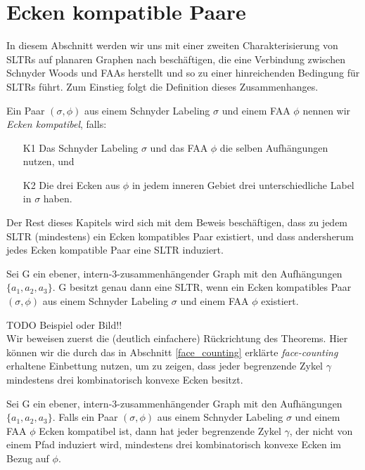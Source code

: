 \section{Ecken kompatible Paare}

In diesem Abschnitt werden wir uns mit einer zweiten Charakterisierung von SLTRs auf planaren Graphen nach \cite{af15} beschäftigen, die eine Verbindung zwischen Schnyder Woods und FAAs herstellt und so zu einer hinreichenden Bedingung für SLTRs führt. Zum Einstieg folgt die Definition dieses Zusammenhanges.

\begin{definition}\label{def_ccc}
Ein Paar $(\sigma,\phi)$ aus einem Schnyder Labeling $\sigma$ und einem FAA $\phi$ nennen wir \textit{Ecken kompatibel}, falls:
\begin{itemize}
\item [K1] Das Schnyder Labeling $\sigma$ und das FAA $\phi$ die selben Aufhängungen nutzen, und
\item [K2] Die drei Ecken aus $\phi$ in jedem inneren Gebiet drei unterschiedliche Label in $\sigma$ haben.
\end{itemize}
\end{definition}

Der Rest dieses Kapitels wird sich mit dem Beweis beschäftigen, dass zu jedem SLTR (mindestens) ein Ecken kompatibles Paar existiert, und dass andersherum jedes Ecken kompatible Paar eine SLTR induziert.

\begin{theorem}\label{theo_ccc}
Sei G ein ebener, intern-3-zusammenhängender Graph mit den Aufhängungen $\{a_1,a_2,a_3\}$. G besitzt genau dann eine SLTR, wenn ein Ecken kompatibles Paar $(\sigma,\phi)$ aus einem Schnyder Labeling $\sigma$ und einem FAA $\phi$ existiert.
\end{theorem}

TODO Beispiel oder Bild!! \\

Wir beweisen zuerst die (deutlich einfachere) Rückrichtung des Theorems. Hier können wir die durch das in Abschnitt \ref{face_counting} erklärte \textit{face-counting} erhaltene Einbettung nutzen, um zu zeigen, dass jeder begrenzende Zykel $\gamma$ mindestens drei kombinatorisch konvexe Ecken besitzt. 

\begin{lemma}\label{lem1}
Sei G ein ebener, intern-3-zusammenhängender Graph mit den Aufhängungen $\{a_1,a_2,a_3\}$. Falls ein Paar $(\sigma,\phi)$ aus einem Schnyder Labeling $\sigma$ und einem FAA $\phi$ Ecken kompatibel ist, dann hat jeder begrenzende Zykel $\gamma$, der nicht von einem Pfad induziert wird, mindestens drei kombinatorisch konvexe Ecken im Bezug auf $\phi$.
\end{lemma}

